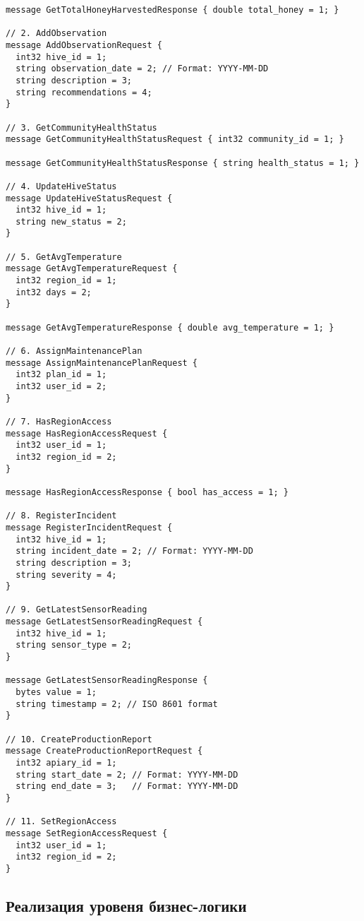 \documentclass{article}
\begin{document}
\begin{lstlisting}
message GetTotalHoneyHarvestedResponse { double total_honey = 1; }

// 2. AddObservation
message AddObservationRequest {
  int32 hive_id = 1;
  string observation_date = 2; // Format: YYYY-MM-DD
  string description = 3;
  string recommendations = 4;
}

// 3. GetCommunityHealthStatus
message GetCommunityHealthStatusRequest { int32 community_id = 1; }

message GetCommunityHealthStatusResponse { string health_status = 1; }

// 4. UpdateHiveStatus
message UpdateHiveStatusRequest {
  int32 hive_id = 1;
  string new_status = 2;
}

// 5. GetAvgTemperature
message GetAvgTemperatureRequest {
  int32 region_id = 1;
  int32 days = 2;
}

message GetAvgTemperatureResponse { double avg_temperature = 1; }

// 6. AssignMaintenancePlan
message AssignMaintenancePlanRequest {
  int32 plan_id = 1;
  int32 user_id = 2;
}

// 7. HasRegionAccess
message HasRegionAccessRequest {
  int32 user_id = 1;
  int32 region_id = 2;
}

message HasRegionAccessResponse { bool has_access = 1; }

// 8. RegisterIncident
message RegisterIncidentRequest {
  int32 hive_id = 1;
  string incident_date = 2; // Format: YYYY-MM-DD
  string description = 3;
  string severity = 4;
}

// 9. GetLatestSensorReading
message GetLatestSensorReadingRequest {
  int32 hive_id = 1;
  string sensor_type = 2;
}

message GetLatestSensorReadingResponse {
  bytes value = 1;
  string timestamp = 2; // ISO 8601 format
}

// 10. CreateProductionReport
message CreateProductionReportRequest {
  int32 apiary_id = 1;
  string start_date = 2; // Format: YYYY-MM-DD
  string end_date = 3;   // Format: YYYY-MM-DD
}

// 11. SetRegionAccess
message SetRegionAccessRequest {
  int32 user_id = 1;
  int32 region_id = 2;
}

\end{lstlisting}

\subsection{Реализация уровеня бизнес-логики}
\end{document}
